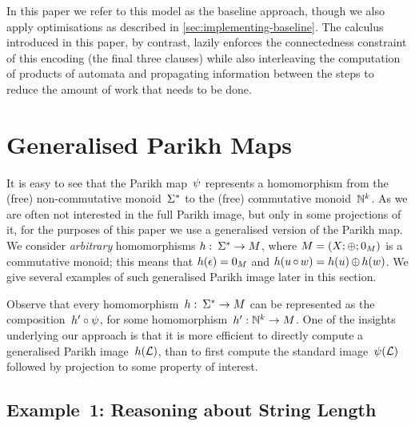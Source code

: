 \documentclass[acmsmall,review,anonymous,screen]{acmart}\settopmatter{printfolios=true,printccs=true,printacmref=true}
\theoremstyle{definition}
\begin{document}
In this paper we refer to this model as the baseline approach, though we also
apply optimisations as described in \cref{sec:implementing-baseline}. The
calculus introduced in this paper, by contrast, lazily enforces the
connectedness constraint of this encoding (the final three clauses) while also
interleaving the computation of products of automata and propagating information
between the steps to reduce the amount of work that needs to be done.
  
\section{Generalised Parikh Maps}\label{sec:generalised}

It is easy to see that the Parikh map~$\operatorname{\psi}$ represents a
homomorphism from the (free) non-commutative monoid~$\Sigma^*$ to the
(free) commutative monoid~$\mathbb{N}^k$. As we are often not
interested in the full Parikh image, but only in some projections of
it, for the purposes of this paper we use a generalised version of the
Parikh map. We consider \emph{arbitrary} homomorphisms
$h:\: \Sigma^* \to M$, where
$M = \left(X;\operatorname{\oplus};0_{M}\right)$ is a commutative
monoid; this means that $h(\epsilon) = 0_{M}$ and
$h(u \operatorname{\circ} w) = h(u) \operatorname{\oplus} h(w)$. We give several
examples of such generalised Parikh image later in this section.

Observe that every homomorphism~$h:\: \Sigma^* \to M$ can be
represented as the composition~$h' \circ \operatorname{\psi}$, for some
homomorphism~$h' : \mathbb{N}^k \to M$. One of the insights underlying our
approach is that it is more efficient to directly compute a
generalised Parikh image~$h(\operatorname{\mathcal{L}})$, than to first compute the
standard image~$\operatorname{\psi}(\operatorname{\mathcal{L}})$ followed by projection to
some property of interest.


\subsection{Example~1: Reasoning about String Length}
\end{document}
